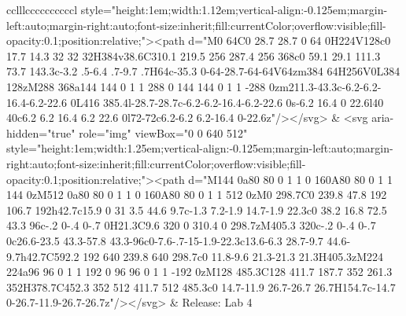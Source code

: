 \documentclass[
]{article}
\begin{document}
\begin{figure*}
\begin{longtable*}{cclllccccccccccl}
style="height:1em;width:1.12em;vertical-align:-0.125em;margin-left:auto;margin-right:auto;font-size:inherit;fill:currentColor;overflow:visible;fill-opacity:0.1;position:relative;"><path d="M0 64C0 28.7 28.7 0 64 0H224V128c0 17.7 14.3 32 32 32H384v38.6C310.1 219.5 256 287.4 256 368c0 59.1 29.1 111.3 73.7 143.3c-3.2 .5-6.4 .7-9.7 .7H64c-35.3 0-64-28.7-64-64V64zm384 64H256V0L384 128zM288 368a144 144 0 1 1 288 0 144 144 0 1 1 -288 0zm211.3-43.3c-6.2-6.2-16.4-6.2-22.6 0L416 385.4l-28.7-28.7c-6.2-6.2-16.4-6.2-22.6 0s-6.2 16.4 0 22.6l40 40c6.2 6.2 16.4 6.2 22.6 0l72-72c6.2-6.2 6.2-16.4 0-22.6z"/></svg> & <svg aria-hidden="true" role="img" viewBox="0 0 640 512" style="height:1em;width:1.25em;vertical-align:-0.125em;margin-left:auto;margin-right:auto;font-size:inherit;fill:currentColor;overflow:visible;fill-opacity:0.1;position:relative;"><path d="M144 0a80 80 0 1 1 0 160A80 80 0 1 1 144 0zM512 0a80 80 0 1 1 0 160A80 80 0 1 1 512 0zM0 298.7C0 239.8 47.8 192 106.7 192h42.7c15.9 0 31 3.5 44.6 9.7c-1.3 7.2-1.9 14.7-1.9 22.3c0 38.2 16.8 72.5 43.3 96c-.2 0-.4 0-.7 0H21.3C9.6 320 0 310.4 0 298.7zM405.3 320c-.2 0-.4 0-.7 0c26.6-23.5 43.3-57.8 43.3-96c0-7.6-.7-15-1.9-22.3c13.6-6.3 28.7-9.7 44.6-9.7h42.7C592.2 192 640 239.8 640 298.7c0 11.8-9.6 21.3-21.3 21.3H405.3zM224 224a96 96 0 1 1 192 0 96 96 0 1 1 -192 0zM128 485.3C128 411.7 187.7 352 261.3 352H378.7C452.3 352 512 411.7 512 485.3c0 14.7-11.9 26.7-26.7 26.7H154.7c-14.7 0-26.7-11.9-26.7-26.7z"/></svg> & Release: Lab 4 \\ 

\end{longtable*}
\end{figure*}
\end{document}
